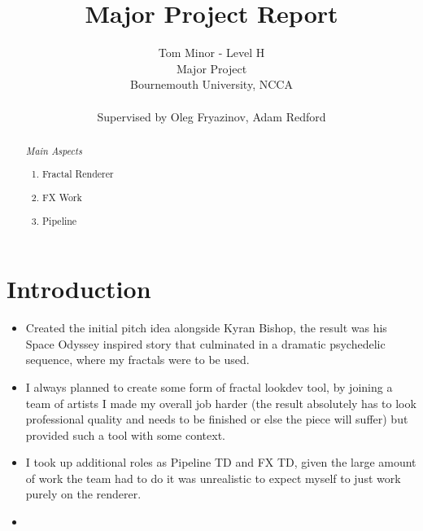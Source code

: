 \documentclass[11pt,a4paper,final,notitlepage]{report}
\makeatletter
\newcommand*{\toccontents}{\@starttoc{toc}}
\makeatother
\begin{document}
\title{ Major Project Report }

\author{ Tom Minor - Level H\\
 		 Major Project\\
 		 Bournemouth University, NCCA\\
 		 \\
 		 Supervised by Oleg Fryazinov, Adam Redford
		}

\date{}
\maketitle

\renewcommand{\abstractname}{Project Overview}
\begin{abstract}

\textit{Main Aspects}
\begin{enumerate}
\item Fractal Renderer
\item FX Work
\item Pipeline
\end{enumerate}

\end{abstract}

\toccontents

\chapter{Introduction}

\begin{itemize}
	\item Created the initial pitch idea alongside Kyran Bishop, the result was his Space Odyssey inspired story that culminated in a dramatic psychedelic sequence, where my fractals were to be used. 
	\item I always planned to create some form of fractal lookdev tool, by joining a team of artists I made my overall job harder (the result absolutely has to look professional quality and needs to be finished or else the piece will suffer) but provided such a tool with some context.
	\item I took up additional roles as Pipeline TD and FX TD, given the large amount of work the team had to do it was unrealistic to expect myself to just work purely on the renderer.
	\item <Explain report overview>
\end{itemize}
\end{document}
